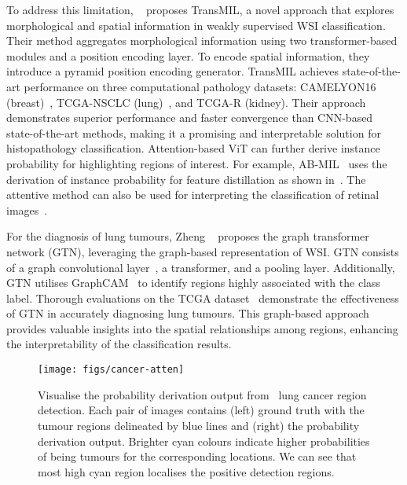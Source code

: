 \documentclass[dvipsnames]{article}
\renewcommand{\cite}[1]{\autocite{#1}}
\begin{document}
To address this limitation, \citeauthor{shao2021transmil}~\cite{shao2021transmil} proposes TransMIL, a novel approach that explores morphological and spatial information in weakly supervised WSI classification. Their method aggregates morphological information using two transformer-based modules and a position encoding layer. To encode spatial information, they introduce a pyramid position encoding generator.
TransMIL achieves state-of-the-art performance on three computational pathology datasets: CAMELYON16 (breast)~\cite{bejnordi2017diagnostic}, TCGA-NSCLC (lung)~\cite{napel2014nsclc}, and TCGA-R (kidney). Their approach demonstrates superior performance and faster convergence than CNN-based state-of-the-art methods, making it a promising and interpretable solution for histopathology classification.
Attention-based ViT can further derive instance probability for highlighting regions of interest.
For example, AB-MIL~\cite{zhang2022dtfd} uses the derivation of instance probability for feature distillation as shown in~.
The attentive method can also be used for interpreting the classification of retinal images~\cite{playout2022focused}.

For the diagnosis of lung tumours, Zheng \citeauthor{zheng2021deep}~\cite{zheng2021deep} proposes the graph transformer network (GTN), leveraging the graph-based representation of WSI. GTN consists of a graph convolutional layer~\cite{kipf2016semi}, a transformer, and a pooling layer. Additionally, GTN utilises GraphCAM~\cite{chefer2021transformer} to identify regions highly associated with the class label. Thorough evaluations on the TCGA dataset~\cite{napel2014nsclc} demonstrate the effectiveness of GTN in accurately diagnosing lung tumours. This graph-based approach provides valuable insights into the spatial relationships among regions, enhancing the interpretability of the classification results.



\begin{figure}[tb]
	\centering
	\texttt{[image: figs/cancer-atten]}
	\caption{\label{fig:cancer-atten}
        Visualise the probability derivation output from~\cite{zhang2022dtfd} lung cancer region detection.
        Each pair of images contains (left) ground truth with the tumour regions delineated by blue lines and (right) the probability derivation output.
        Brighter cyan colours indicate higher probabilities of being tumours for the corresponding locations.
        We can see that most high cyan region localises the positive detection regions.
    }
\end{figure}
\end{document}
